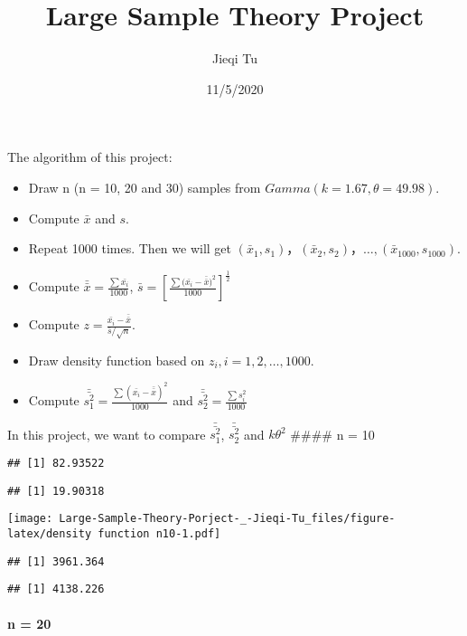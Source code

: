 \documentclass[
]{article}
\title{Large Sample Theory Project}
\author{Jieqi Tu}
\date{11/5/2020}
\providecommand{\tightlist}{%
  \setlength{\itemsep}{0pt}\setlength{\parskip}{0pt}}
\begin{document}
\maketitle

The algorithm of this project:

\begin{itemize}
\tightlist
\item
  Draw n (n = 10, 20 and 30) samples from
  \(Gamma(k=1.67, \theta=49.98)\).
\item
  Compute \(\bar x\) and \(s\).
\item
  Repeat 1000 times. Then we will get
  \((\bar x_1, s_1)，(\bar x_2, s_2)，…,(\bar x_{1000}, s_{1000})\).
\item
  Compute \(\bar{\bar{x}}=\frac{\sum\bar{x_i}}{1000}\),
  \(\bar{s}=[\frac{\sum{(\bar{x_i}-\bar{\bar{x}}})^2}{1000}]^{\frac{1}{2}}\)
\item
  Compute \(z=\frac{\bar{x_i}-\bar{\bar{x}}}{\bar s/\sqrt{n}}\).
\item
  Draw density function based on \(z_i, i=1, 2, …,1000\).
\item
  Compute
  \(\bar{\bar{s_1^2}}=\frac{\sum{(\bar{x_i}-\bar{\bar{x}})^2}}{1000}\)
  and \(\bar{\bar{s_2^2}}=\frac{\sum{s_i^2}}{1000}\)
\end{itemize}

In this project, we want to compare \(\bar{\bar{s_1^2}}\),
\(\bar{\bar{s_2^2}}\) and \(k\theta^2\) \#\#\#\# n = 10

\begin{verbatim}
## [1] 82.93522
\end{verbatim}

\begin{verbatim}
## [1] 19.90318
\end{verbatim}

\texttt{[image: Large-Sample-Theory-Porject-\_-Jieqi-Tu\_files/figure-latex/density function n10-1.pdf]}

\begin{verbatim}
## [1] 3961.364
\end{verbatim}

\begin{verbatim}
## [1] 4138.226
\end{verbatim}

\hypertarget{n-20}{%
\paragraph{n = 20}\label{n-20}}
\end{document}
